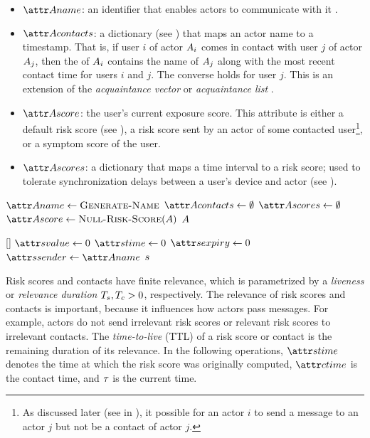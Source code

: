 \begin{itemize}
	\item $\aActorName$: an identifier that enables actors to communicate with it \cite{Hewitt1977, Agha1985}.
	\item $\aActorContacts$: a dictionary (see ) that maps an actor name to a timestamp. That is, if user $i$ of actor $A_i$ comes in contact with user $j$ of actor $A_j$, then the  of $A_i$ contains the name of $A_j$ along with the most recent contact time for users $i$ and $j$. The converse holds for user $j$. This is an extension of the \emph{acquaintance vector} \cite{Hewitt1977} or \emph{acquaintance list} \cite{Agha1985}.
	\item $\aActorScore$: the user's current exposure score. This attribute is either a default risk score (see \cDefaultScore{}), a risk score sent by an actor of some contacted user\footnote{As discussed later (see \cHandleContactMessage{} in ), it possible for an actor $i$ to send a message to an actor $j$ but not be a contact of actor $j$.}, or a symptom score of the user.
	\item $\aActorScores$: a dictionary that maps a time interval to a risk score; used to tolerate synchronization delays between a user's device and actor (see ).
\end{itemize}
%
\begin{function}{\nInitializeActor}
    \State $\aActorName \assign \cGenerateName$
    \State $\aActorContacts \assign \emptyset$
    \State $\aActorScores \assign \emptyset$
    \State $\aActorScore \assign \cNullRiskScore[\vActor]$
    \State \Return $A$
\end{function}
%
\begin{function}{\nNullRiskScore}[\vActor]
    \State $\aScoreValue \assign 0$
    \State $\aScoreTime \assign 0$
    \State $\aScoreExpiry \assign 0$
    \State $\aScoreSender \assign \aActorName$
    \State \Return $s$
\end{function}
%
Risk scores and contacts have finite relevance, which is parametrized by a \emph{liveness} or \emph{relevance duration} $T_s, T_c > 0$, respectively. The relevance of risk scores and contacts is important, because it influences how actors pass messages. For example, actors do not send irrelevant risk scores or relevant risk scores to irrelevant contacts. The \emph{time-to-live} (TTL) of a risk score or contact is the remaining duration of its relevance. In the following operations, $\aScoreTime$ denotes the time at which the risk score was originally computed, $\aContactTime$ is the contact time, and $\tau$ is the current time.
